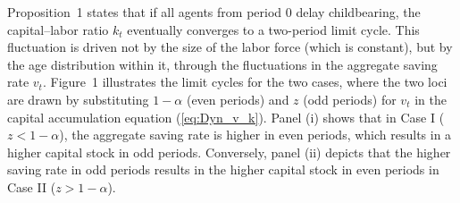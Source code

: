 \documentclass{MBE}%
\begin{document}
{%

Proposition~1 states that if all agents from period 0 delay childbearing, the capital--labor ratio
$k_{t}$ eventually converges to a two-period limit cycle. This fluctuation is driven not by the
size of the labor force (which is constant), but by the age distribution within it, through the
fluctuations in the aggregate saving rate $v_{t}$. Figure~1 illustrates the limit cycles for the
two cases, where the two loci are drawn by substituting $1-\alpha$ (even periods) and $z$ (odd
periods) for $v_{t}$ in the capital accumulation equation (\ref{eq:Dyn_v_k}). Panel (i) shows that
in Case I ($z<1-\alpha$), the aggregate saving rate is higher in even periods, which results in a
higher capital stock in odd periods. Conversely, panel (ii) depicts that the higher saving rate in
odd periods results in the higher capital stock in even periods in Case II ($z>1-\alpha$).

}
\end{document}
